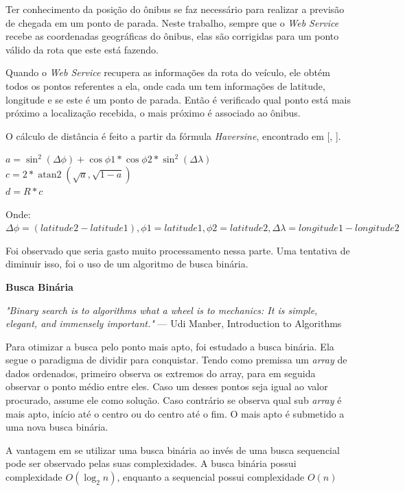 \documentclass[
	12pt,				%
	oneside,			%
	a4paper,			%
	brazil				%
]{abntex2}
\DeclareMathOperator{\atantwo}{atan2}
\newcommand{\citecustom}[1]{[\citeauthoronline{#1}, \citeyear{#1}]}
\begin{document}
{Ter conhecimento da posição do ônibus se faz necessário para realizar a previsão de chegada em um ponto de parada. Neste trabalho, sempre que o \textit{Web Service} recebe as coordenadas geográficas do ônibus, elas são corrigidas para um ponto válido da rota que este está fazendo.

Quando o \textit{Web Service} recupera as informações da rota do veículo, ele obtém todos os pontos referentes a ela, onde cada um tem informações de latitude, longitude e se este é um ponto de parada. Então é verificado qual ponto está mais próximo a localização recebida, o mais próximo é associado ao ônibus.

O cálculo de distância é feito a partir da fórmula \textit{Haversine}, encontrado em \citecustom{movablescripts}.

\begin{center}

$ a = \sin^2(\Delta\phi) + \cos\phi1 * \cos\phi2 * \sin^2(\Delta\lambda) $  \\
$ c = 2 * \atantwo(\sqrt{a},\sqrt{1 - a}) $ \\
$ d = R * c $ 

\end{center}

Onde: $ \Delta\phi = (latitude2 - latitude1), \phi1 = latitude1, \phi2 = latitude2, \Delta\lambda = longitude1 - longitude2 $ 

Foi observado que seria gasto muito processamento nessa parte. Uma tentativa de diminuir isso, foi o uso de um algoritmo de busca binária.

\textbf{Busca Binária}

\begin{flushright}
\textit{"Binary search is to algorithms
what a wheel is to mechanics:
It is simple, elegant, and immensely important."}
— Udi Manber, Introduction to Algorithms
\end{flushright}

Para otimizar a busca pelo ponto mais apto, foi estudado a busca binária. Ela segue o paradigma de dividir para conquistar. Tendo como premissa um \textit{array} de dados ordenados, primeiro observa os extremos do array, para em seguida observar o ponto médio entre eles. Caso um desses pontos seja igual ao valor procurado, assume ele como solução. Caso contrário se observa qual sub \textit{array} é mais apto, início até o centro ou do centro até o fim. O mais apto é submetido a uma nova busca binária. 

A vantagem em se utilizar uma busca binária ao invés de uma busca sequencial pode ser observado pelas suas complexidades. A busca binária possui complexidade $O(\log_2 n)$, enquanto a sequencial possui complexidade $O(n)$

}
\end{document}
